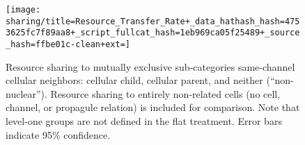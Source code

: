 \begin{figure*}[!htbp]
\begin{center}

\texttt{[image: sharing/title=Resource\_Transfer\_Rate+\_data\_hathash\_hash=4753625fc7f89aa8+\_script\_fullcat\_hash=1eb969ca05f25489+\_source\_hash=ffbe01c-clean+ext=]}

\caption{
Resource sharing to mutually exclusive sub-categories same-channel cellular neighbors: cellular child, cellular parent, and neither (``non-nuclear'').
Resource sharing to entirely non-related cells (no cell, channel, or propagule relation) is included for comparison.
Note that level-one groups are not defined in the flat treatment.
Error bars indicate 95\% confidence.
}
\label{fig:sharing_channelmate}
\end{center}
\end{figure*}
